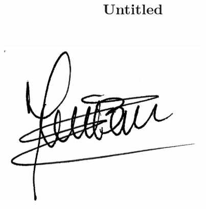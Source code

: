 \documentclass[12pt]{article}
\begin{document}
\title{Untitled}

\includegraphics{figuras/firma.png}
\end{document}
